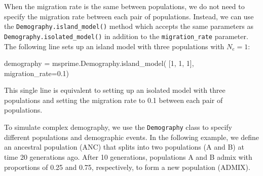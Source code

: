 \documentclass[graybox]{svmult}
\begin{document}
\label{island-model}
When the migration rate is the same between populations, we do not
need to specify the migration rate between each pair of populations. Instead,
we can use the \texttt{Demography.island\_model()} method which accepts
the same parameters as \texttt{Demography.isolated\_model()} in
addition to the \texttt{migration\_rate} parameter. The following line sets up an
island model with three populations with $N_e = 1$:
\begin{pythoncode}
    demography = msprime.Demography.island_model(
        [1, 1, 1], migration_rate=0.1)
\end{pythoncode}
This single line is equivalent to setting up an isolated model with three populations
and setting the migration rate to 0.1 between each pair of populations.




\label{Complex-demography}
To simulate complex demography, we use the \texttt{Demography} class to specify different
populations and demographic events. In the following example, we define
an ancestral population (ANC) that splits into two populations (A and B) at time
20 generations ago. After 10 generations, populations A and B admix with proportions of 0.25
and 0.75, respectively, to form a new population (ADMIX).
\end{document}
